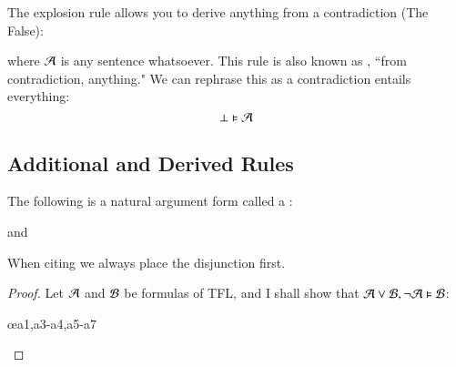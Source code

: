 \begin{definition}
    The explosion rule allows you to derive anything from a contradiction (The False): \begin{fitchproof}
         
    \end{fitchproof}
    where $\mathcal{A}$ is any sentence whatsoever. This rule is also known as , ``from contradiction, anything." We can rephrase this as a contradiction entails everything: \begin{equation*}
        \bot \vDash \mathcal{A}
    \end{equation*}
\end{definition}



\subsection{ Additional and Derived Rules}

\begin{definition}
    The following is a natural argument form called a : \begin{fitchproof}
         
    \end{fitchproof}
    and \begin{fitchproof}
         
    \end{fitchproof}
    When citing we always place the disjunction first.
\end{definition}
\begin{proof}
    Let $\mathcal{A}$ and $\mathcal{B}$ be formulas of TFL, and I shall show that $\mathcal{A}\vee\mathcal{B},\neg\mathcal{A}\vDash \mathcal{B}$:
    \begin{fitchproof}
        \open
             
        \close
        \open 
             
             
        \close
         \oe{a1,a3-a4,a5-a7}
    \end{fitchproof}
\end{proof}

